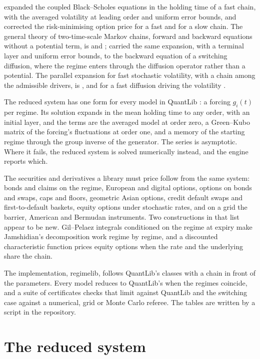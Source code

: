 \documentclass[11pt]{article}
\theoremstyle{remark}
\newcommand{\rl}{\textsf{regimelib}}
\newcommand{\ql}{\textsf{QuantLib}}
\begin{document}
\citet{yin2009option} expanded the coupled
Black--Scholes equations in the holding time of a fast chain, with the averaged volatility at leading order and
uniform error bounds, and \citet{basu2009} corrected the risk-minimising option price for a fast and for a slow
chain. The general theory of two-time-scale Markov chains, forward and backward equations without a potential
term, is \citet{yin2013} and \citet{yin2009backward}; \citet{nguyen2011,nguyen2013} carried the same expansion,
with a terminal layer and uniform error bounds, to the backward equation of a switching diffusion, where the
regime enters through the diffusion operator rather than a potential. The parallel expansion for fast stochastic
volatility, with a chain among the admissible drivers, is \citet{sircar1999}, and for a fast diffusion driving the
volatility \citet{khasminskii2005}.

The reduced system has one form for every model in \ql{} \citep{quantlib}: a forcing $g_i(t)$ per regime. Its
solution expands in the mean holding time to any order, with an initial layer, and the terms are the averaged
model at order zero, a Green--Kubo matrix of the forcing's fluctuations at order one, and a memory of the starting
regime through the group inverse of the generator. The series is asymptotic. Where it fails, the reduced system
is solved numerically instead, and the engine reports which.

The securities and derivatives a library must price follow from the same system: bonds and claims on the regime,
European and digital options, options on bonds and swaps, caps and floors, geometric Asian options, credit default
swaps and first-to-default baskets, equity options under stochastic rates, and on a grid the barrier, American and
Bermudan instruments. Two constructions in that list appear to be new. Gil--Pelaez integrals conditioned on
the regime at expiry make Jamshidian's decomposition \citep{jamshidian1989} work regime by regime, and a discounted
characteristic function prices equity options when the rate and the underlying share the chain.

The implementation, \rl{}, follows \ql{}'s classes with a chain in front of the parameters. Every model reduces
to \ql{}'s when the regimes coincide, and a suite of certificates checks that limit against \ql{} and the
switching case against a numerical, grid or Monte Carlo referee. The tables are written by a script in the
repository.

\section{The reduced system}
\label{sec:reduced}
\end{document}
